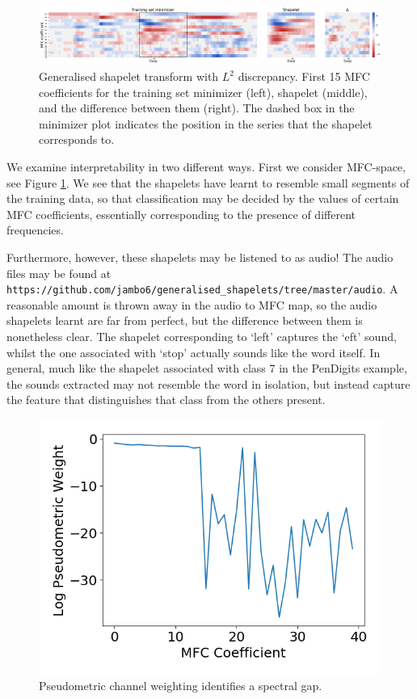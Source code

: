 \documentclass{article}
\theoremstyle{plain}
\theoremstyle{definition}
\begin{document}
\begin{figure}
			\centering
			\includegraphics[width=\linewidth]{images/new_speech_commands_heatmap.png}
			\caption{Generalised shapelet transform with $L^2$ discrepancy. First 15 MFC coefficients for the training set minimizer (left), shapelet (middle), and the difference between them (right). The dashed box in the minimizer plot indicates the position in the series that the shapelet corresponds to.}\label{fig:speech_commands}
\end{figure}

We examine interpretability in two different ways. First we consider MFC-space, see Figure \ref{fig:speech_commands}. We see that the shapelets have learnt to resemble small segments of the training data, so that classification may be decided by the values of certain MFC coefficients, essentially corresponding to the presence of different frequencies.

Furthermore, however, these shapelets may be listened to as audio! The audio files may be found at \texttt{https://github.com/jambo6/generalised\_shapelets/tree/master/audio}. A reasonable amount is thrown away in the audio to MFC map, so the audio shapelets learnt are far from perfect, but the difference between them is nonetheless clear. The shapelet corresponding to  `left' captures the `eft' sound, whilst the one associated with `stop' actually sounds like the word itself. In general, much like the shapelet associated with class 7 in the PenDigits example, the sounds extracted may not resemble the word in isolation, but instead capture the feature that distinguishes that class from the others present.

\begin{figure}\centering
\vspace{-2em}
\includegraphics[width=\linewidth]{images/spectral.png}
\caption{Pseudometric channel weighting identifies a spectral gap.}\label{fig:spectral}
\end{figure}
\end{document}
